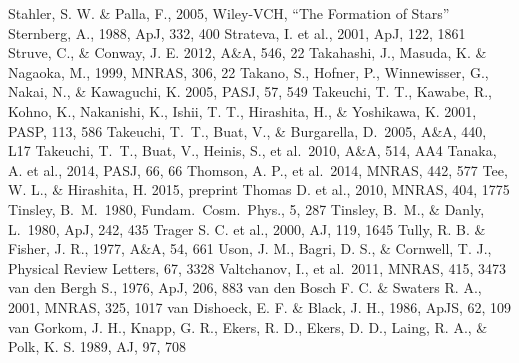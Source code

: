 \begin{thebibliography}{99}
\begin{multicols}{2}
{
	Stahler, S. W. \& Palla, F., 2005, Wiley-VCH, ``The Formation of Stars''
      	Sternberg, A., 1988, ApJ, 332, 400
	Strateva, I. et al., 2001, ApJ, 122, 1861
    	Struve, C., \& Conway, J. E. 2012, A\&A, 546, 22
	Takahashi, J., Masuda, K. \& Nagaoka, M., 1999, MNRAS, 306, 22
    	Takano, S., Hofner, P., Winnewisser, G., Nakai, N., \& Kawaguchi, K.
    	2005, PASJ, 57, 549
    	Takeuchi, T. T., Kawabe, R., Kohno, K., Nakanishi, K., Ishii, T. T., Hirashita, H.,
    	\& Yoshikawa, K. 2001, PASP, 113, 586
	Takeuchi, T.~T., Buat, V., \& Burgarella, D.\ 2005, A\&A, 440, L17 
	Takeuchi, T.~T., Buat, V., Heinis, S., et al.\ 2010, A\&A, 514, AA4 
	Tanaka, A. et al., 2014, PASJ, 66, 66
    	Thomson, A. P., et al.\ 2014, MNRAS, 442, 577
   	Tee, W. L., \& Hirashita, H. 2015, preprint
	Thomas D. et al., 2010, MNRAS, 404, 1775
	Tinsley, B.~M.\ 1980, Fundam.\ Cosm.\ Phys., 5, 287 
	Tinsley, B.~M., \& Danly, L.\ 1980, ApJ, 242, 435 
	Trager S. C. et al., 2000, AJ, 119, 1645
	Tully, R. B. \& Fisher, J. R., 1977, A\&A, 54, 661
    	Uson, J. M., Bagri, D. S., \& Cornwell, T. J., Physical Review Letters, 67, 3328
    	Valtchanov, I., et al.\ 2011, MNRAS, 415, 3473
	van den Bergh S., 1976, ApJ, 206, 883
	van den Bosch F. C. \& Swaters R. A., 2001, MNRAS, 325, 1017
      van Dishoeck, E. F. \& Black, J. H., 1986, ApJS, 62, 109
    	van Gorkom, J. H., Knapp, G. R., Ekers, R. D., Ekers, D. D.,
    	Laing, R. A., \& Polk, K. S. 1989, AJ, 97, 708
}
\end{multicols}
\end{thebibliography}
